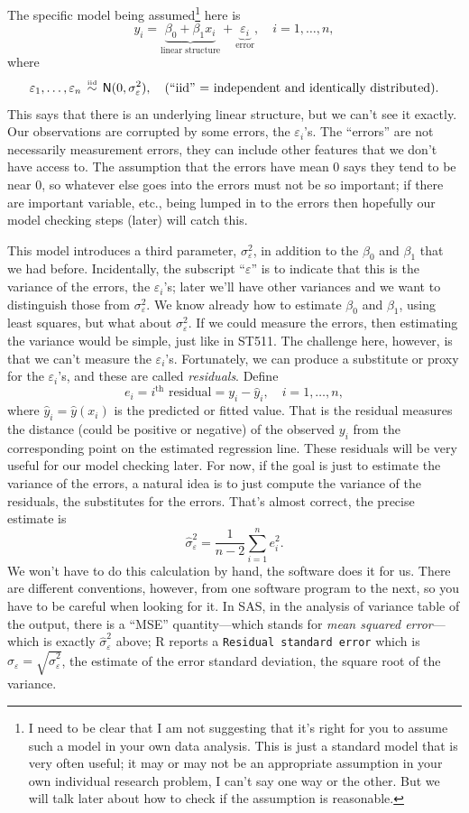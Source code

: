 \documentclass[a4paper, 12pt]{article}
\theoremstyle{plain}
\theoremstyle{definition}
\theoremstyle{remark}
\newcommand{\eps}{\varepsilon}
\newcommand{\nm}{\mathsf{N}}
\newcommand{\iid}{\overset{\text{\tiny iid}}{\,\sim\,}}
\begin{document}
The specific model being assumed\footnote{I need to be clear that I am not suggesting that it's right for you to assume such a model in your own data analysis.  This is just a standard model that is very often useful; it may or may not be an appropriate assumption in your own individual research problem, I can't say one way or the other.  But we will talk later about how to check if the assumption is reasonable.} here is
\[ y_i = \underbrace{\beta_0 + \beta_1 x_i}_{\text{linear structure}} + \underbrace{\eps_i}_{\text{error}}, \quad i=1,\ldots,n, \]
where 
\[ \eps_1, \ldots, \eps_n \iid \nm(0, \sigma_\eps^2), \quad \text{(``iid'' = independent and identically distributed)}. \]
This says that there is an underlying linear structure, but we can't see it exactly.  Our observations are corrupted by some errors, the $\eps_i$'s.  The ``errors'' are not necessarily measurement errors, they can include other features that we don't have access to.  The assumption that the errors have mean 0 says they tend to be near 0, so whatever else goes into the errors must not be so important; if there are important variable, etc., being lumped in to the errors then hopefully our model checking steps (later) will catch this.  

This model introduces a third parameter, $\sigma_\eps^2$, in addition to the $\beta_0$ and $\beta_1$ that we had before.  Incidentally, the subscript ``$\eps$'' is to indicate that this is the variance of the errors, the $\eps_i$'s; later we'll have other variances and we want to distinguish those from $\sigma_\eps^2$.  We know already how to estimate $\beta_0$ and $\beta_1$, using least squares, but what about $\sigma_\eps^2$.  If we could measure the errors, then estimating the variance would be simple, just like in ST511.  The challenge here, however, is that we can't measure the $\eps_i$'s.  Fortunately, we can produce a substitute or proxy for the $\eps_i$'s, and these are called {\em residuals}.  Define 
\[ e_i = \text{$i^\text{th}$ residual} = y_i - \hat y_i, \quad i=1,\ldots,n, \]
where $\hat y_i = \hat y(x_i)$ is the predicted or fitted value.  That is the residual measures the distance (could be positive or negative) of the observed $y_i$ from the corresponding point on the estimated regression line.  These residuals will be very useful for our model checking later.  For now, if the goal is just to estimate the variance of the errors, a natural idea is to just compute the variance of the residuals, the substitutes for the errors.  That's almost correct, the precise estimate is 
\[ \hat\sigma_\eps^2 = \frac{1}{n-2} \sum_{i=1}^n e_i^2. \]
We won't have to do this calculation by hand, the software does it for us.  There are different conventions, however, from one software program to the next, so you have to be careful when looking for it.  In SAS, in the analysis of variance table of the output, there is a ``MSE'' quantity---which stands for {\em mean squared error}---which is exactly $\hat\sigma_\eps^2$ above; R reports a {\tt Residual standard error} which is $\hat\sigma_\eps = \sqrt{\hat\sigma_\eps^2}$, the estimate of the error standard deviation, the square root of the variance.  
\end{document}
